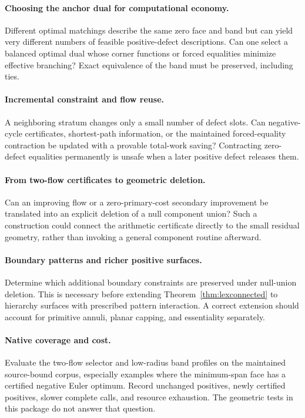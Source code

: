 \documentclass[11pt,letterpaper]{article}
\theoremstyle{definition}
\begin{document}
\paragraph{Choosing the anchor dual for computational economy.}
Different optimal matchings describe the same zero face and band but can yield very different numbers of feasible positive-defect descriptions. Can one select a balanced optimal dual whose corner functions or forced equalities minimize effective branching? Exact equivalence of the band must be preserved, including ties.

\paragraph{Incremental constraint and flow reuse.}
A neighboring stratum changes only a small number of defect slots. Can negative-cycle certificates, shortest-path information, or the maintained forced-equality contraction be updated with a provable total-work saving? Contracting zero-defect equalities permanently is unsafe when a later positive defect releases them.

\paragraph{From two-flow certificates to geometric deletion.}
Can an improving flow or a zero-primary-cost secondary improvement be translated into an explicit deletion of a null component union? Such a construction could connect the arithmetic certificate directly to the small residual geometry, rather than invoking a general component routine afterward.

\paragraph{Boundary patterns and richer positive surfaces.}
Determine which additional boundary constraints are preserved under null-union deletion. This is necessary before extending Theorem~\ref{thm:lexconnected} to hierarchy surfaces with prescribed pattern interaction. A correct extension should account for primitive annuli, planar capping, and essentiality separately.

\paragraph{Native coverage and cost.}
Evaluate the two-flow selector and low-radius band profiles on the maintained source-bound corpus, especially examples where the minimum-span face has a certified negative Euler optimum. Record unchanged positives, newly certified positives, slower complete calls, and resource exhaustion. The geometric tests in this package do not answer that question.
\end{document}
